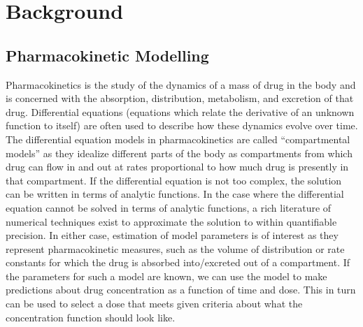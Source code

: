 \section{Background}
\subsection*{Pharmacokinetic Modelling}

Pharmacokinetics is the study of the dynamics of a mass of drug in the body and is concerned with the absorption, distribution, metabolism, and excretion of that drug.  Differential equations (equations which relate the derivative of an unknown function to itself) are often used to describe how these dynamics evolve over time. The differential equation models in pharmacokinetics are called “compartmental models” as they idealize different parts of the body as compartments from which drug can flow in and out at rates proportional to how much drug is presently in that compartment. If the differential equation is not too complex, the solution can be written in terms of analytic functions.  In the case where the differential equation cannot be solved in terms of analytic functions, a rich literature of numerical techniques exist to approximate the solution to within quantifiable precision. In either case, estimation of model parameters is of  interest as they represent pharmacokinetic measures, such as the volume of distribution or rate constants for which the drug is absorbed into/excreted out of a compartment. If the parameters for such a model are known, we can use the model to make predictions about drug concentration as a function of time and dose. This in turn can be used to select a dose that meets given criteria about what the concentration function should look like.

